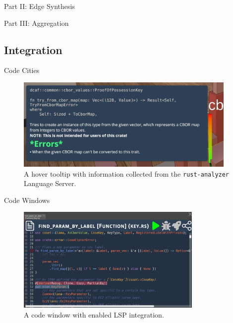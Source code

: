 \documentclass[xcolor={dvipsnames},aspectratio=169,compress]{beamer} %
\begin{document}
\begin{frame}{Part II: Edge Synthesis}
\end{frame}

\begin{frame}{Part III: Aggregation}

\end{frame}


\subsection{Integration}

\begin{frame}{Code Cities}
	\begin{figure}
		\begin{center}
			\includegraphics[trim={0.3cm 0.8cm 2.7cm 0.3cm},clip,width=0.95\textwidth]{figures/HoverInfo}
		\end{center}
		\caption{A hover tooltip with information collected from the \texttt{rust-analyzer} Language Server.}
	\end{figure}

\end{frame}

\begin{frame}{Code Windows}
	\begin{figure}
		\begin{center}
			\includegraphics[width=0.8\textwidth]{figures/CodeWindow}
		\end{center}
		\caption{A code window with enabled LSP integration.}
	\end{figure}
\end{frame}
\end{document}
